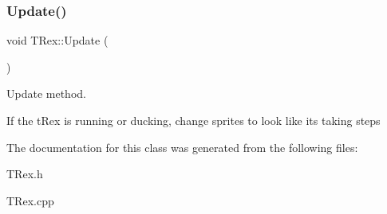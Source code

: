 \subsubsection{\texorpdfstring{Update()}{Update()}}
{\footnotesize\ttfamily void T\+Rex\+::\+Update (\begin{DoxyParamCaption}{ }\end{DoxyParamCaption})}



Update method. 

If the t\+Rex is running or ducking, change sprites to look like it\textquotesingle{}s taking steps 

The documentation for this class was generated from the following files\+:\begin{DoxyCompactItemize}
\item 
T\+Rex.\+h\item 
T\+Rex.\+cpp\end{DoxyCompactItemize}
